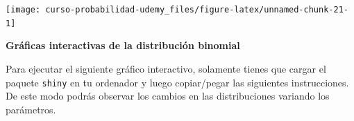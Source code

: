 \documentclass[]{book}
\newenvironment{Shaded}{\begin{snugshade}}{\end{snugshade}}
\newcommand{\DataTypeTok}[1]{\textcolor[rgb]{0.13,0.29,0.53}{#1}}
\newcommand{\DecValTok}[1]{\textcolor[rgb]{0.00,0.00,0.81}{#1}}
\newcommand{\FloatTok}[1]{\textcolor[rgb]{0.00,0.00,0.81}{#1}}
\newcommand{\KeywordTok}[1]{\textcolor[rgb]{0.13,0.29,0.53}{\textbf{#1}}}
\newcommand{\NormalTok}[1]{#1}
\newcommand{\OperatorTok}[1]{\textcolor[rgb]{0.81,0.36,0.00}{\textbf{#1}}}
\newcommand{\StringTok}[1]{\textcolor[rgb]{0.31,0.60,0.02}{#1}}
\begin{document}
\begin{center}\texttt{[image: curso-probabilidad-udemy\_files/figure-latex/unnamed-chunk-21-1]} \end{center}

\textbf{Gráficas interactivas de la distribución binomial}

Para ejecutar el siguiente gráfico interactivo, solamente tienes que cargar el paquete \texttt{shiny} en tu ordenador y luego copiar/pegar las siguientes instrucciones. De este modo podrás observar los cambios en las distribuciones variando los parámetros.

\begin{Shaded}
\end{Shaded}
\end{document}
